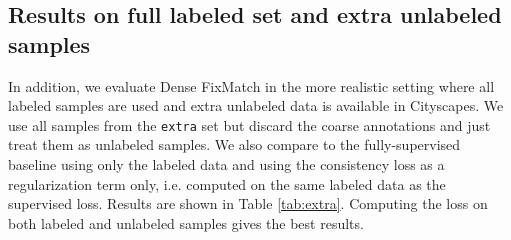 \begin{table}[h!]
        \centering
\caption{\small{Ablation on the use of Mean Teacher (MT) framework, the relation between crops in the two views of Dense FixMatch and the use of the geometric, color or all augmentations in RandAugment. Using MT on its own with the augmentation pipeline of the supervised baseline. We use a logistic warm-up schedule for the consistency weight during the first 60 epochs. is our setting for the main experiments.}}
    \label{tab:further_ablation}
\end{table}

\subsection{Results on full labeled set and extra unlabeled samples}
In addition, we evaluate Dense FixMatch in the more realistic setting where all labeled samples are used and extra unlabeled data is available in Cityscapes. We use all samples from the \texttt{extra} set but discard the coarse annotations and just treat them as unlabeled samples. We also compare to the fully-supervised baseline using only the labeled data and using the consistency loss as a regularization term only, i.e. computed on the same labeled data as the supervised loss. Results are shown in Table \ref{tab:extra}. Computing the loss on both labeled and unlabeled samples gives the best results.

